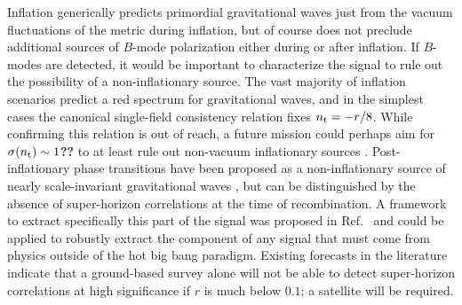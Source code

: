 Inflation generically predicts primordial gravitational waves just from the vacuum fluctuations of the metric during inflation, but of course does not preclude additional sources of $B$-mode polarization either during or after inflation. If $B$-modes are detected, it would be important to characterize the signal to rule out the possibility of a non-inflationary source. 
The vast majority of inflation scenarios predict a red spectrum for gravitational waves, and in the simplest cases the canonical single-field consistency relation fixes $n_{\rm t}=-r/8$. While confirming this relation is out of reach, a future mission could perhaps aim for $\sigma(n_{\rm t})\sim1${\bf ??} to at least rule out non-vacuum inflationary sources  \cite{Namba:2015gja,Peloso:2016gqs}. Post-inflationary phase transitions have been proposed as a non-inflationary source of nearly scale-invariant gravitational waves \cite{Krauss:1991qu,JonesSmith:2007ne,Giblin:2011yh,Figueroa:2012kw,Fenu:2013tea}, but can be distinguished by the absence of super-horizon correlations at the time of recombination. A framework to extract specifically this part of the signal was proposed in Ref.~\cite{Baumann:2009mq} and could be applied to robustly extract the component of any signal that must come from physics outside of the hot big bang paradigm. Existing forecasts in the literature \cite{Lee:2014cya} indicate that a ground-based survey alone will not be able to detect super-horizon correlations at high significance if $r$ is much below $0.1$; a satellite will be required.

